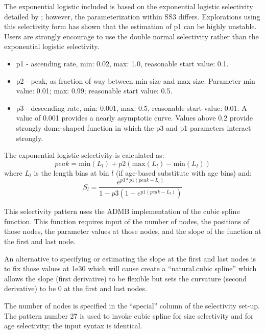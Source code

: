 The exponential logistic included is based on the exponential logistic selectivity detailed by \citet{thompson-confounding-1994}; however, the parameterization within SS3 differs. Explorations using this selectivity form has shown that the estimation of p1 can be highly unstable. Users are strongly encourage to use the double normal selectivity rather than the exponential logistic selectivity.
	\begin{itemize}
		\item p1 - ascending rate, min: 0.02, max: 1.0, reasonable start value: 0.1.
		\item p2 - peak, as fraction of way between min size and max size. Parameter min value: 0.01; max: 0.99; reasonable start value: 0.5.
		\item p3 - descending rate, min: 0.001, max: 0.5, reasonable start value: 0.01. A value of 0.001 provides a nearly asymptotic curve. Values above 0.2 provide strongly dome-shaped function in which the p3 and p1 parameters interact strongly.
	\end{itemize}

The exponential logistic selectivity is calculated as:
	\begin{equation}
	peak = \text{min}(L_l) + p2(\text{max}(L_l) - \text{min}(L_l) )
	\end{equation}
where $L_l$ is the length bins at bin $l$ (if age-based substitute with age bins) and:
	\begin{equation}
	S_l = \frac{e^{p3*p1(peak-L_l)}}{1-p3(1-e^{p1(peak- L_l)})}
	\end{equation}

 \hypertarget{cubic-spline}{}
This selectivity pattern uses the ADMB implementation of the cubic spline
function. This function requires input of the number of nodes, the positions
of those nodes, the parameter values at those nodes, and the slope of the
function at the first and last node.

An alternative to specifying or estimating the slope at the first and last
nodes is to fix those values at 1e30 which will cause create a ``natural.cubic spline'' 
which allows the slope (first derivative) to be flexible but
sets the curvature (second derivative) to be 0 at the first and last nodes.

The number of nodes is specified in the ``special'' column of the selectivity
set-up. The pattern number 27 is used to invoke cubic spline for size
selectivity and for age selectivity; the input syntax is identical.
	
